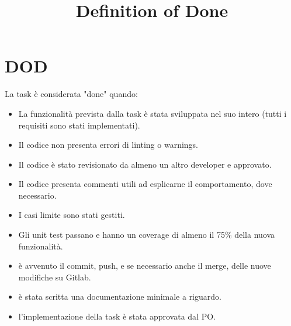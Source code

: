 \documentclass{article}
\title{Definition of Done}
\author{}
\date{}
\begin{document}
\maketitle

\section*{DOD}
La task è considerata "done" quando:
\begin{itemize}[leftmargin=*]
    \item La funzionalità prevista dalla task è stata sviluppata nel suo intero (tutti i requisiti sono stati implementati).
    \item Il codice non presenta errori di linting o warnings.
    \item Il codice è stato revisionato da almeno un altro developer e approvato.
    \item Il codice presenta commenti utili ad esplicarne il comportamento, dove necessario.
    \item I casi limite sono stati gestiti.
    \item Gli unit test passano e hanno un coverage di almeno il 75\% della nuova funzionalità.
    \item è avvenuto il commit, push, e se necessario anche il merge, delle nuove modifiche su Gitlab.
    \item è stata scritta una documentazione minimale a riguardo.
    \item l'implementazione della task è stata approvata dal PO.
\end{itemize}
\end{document}

